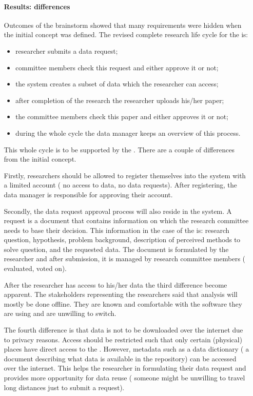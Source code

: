 \paragraph{Results: differences}
Outcomes of the brainstorm showed that many requirements were hidden when the initial concept was defined.
The revised complete research life cycle for the \project{} is:
\begin{itemize}
	\item researcher submits a data request;
	\item committee members check this request and either approve it or not;
	\item the system creates a subset of data which the researcher can access;
	\item after completion of the research the researcher uploads his/her paper;
	\item the committee members check this paper and either approves it or not;
	\item during the whole cycle the data manager keeps an overview of this process.
\end{itemize}

This whole cycle is to be supported by the \ivfsystem{}.
There are a couple of differences from the initial concept.

Firstly, researchers should be allowed to register themselves into the system with a limited account (\ie{} no access to data, no data requests).
After registering, the data manager is responsible for approving their account.

Secondly, the data request approval process will also reside in the system.
A request is a document that contains information on which the research committee needs to base their decision.
This information in the case of the \ivfsystem{} is: research question, hypothesis, problem background, description of perceived methods to solve question, and the requested data.
The document is formulated by the researcher and after submission, it is managed by research committee members (\ie{} evaluated, voted on).

After the researcher has access to his/her data the third difference become apparent.
The stakeholders representing the researchers said that analysis will mostly be done offline.
They are known and comfortable with the software they are using and are unwilling to switch.

The fourth difference is that data is not to be downloaded over the internet due to privacy reasons. 
Access should be restricted such that only certain (physical) places have direct access to the \projectdata{}.
However, metadata such as a data dictionary (\ie{} a document describing what data is available in the repository) can be accessed over the internet.
This helps the researcher in formulating their data request and provides more opportunity for data reuse (\eg{} someone might be unwilling to travel long distances just to submit a request).

